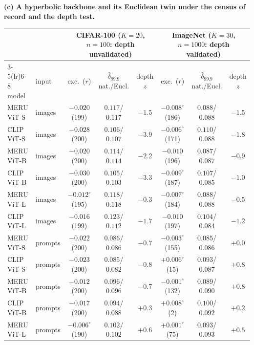 \begin{table}[tbp]\ContinuedFloat
\centering
\scriptsize
\setlength{\tabcolsep}{2.2pt}
\noindent\textbf{(c) A hyperbolic backbone and its Euclidean twin under the census of record and the depth test.}\par\vspace{1.5pt}
\begin{tabular}{llccc@{\hspace{8pt}}ccc}
\toprule
 & & \multicolumn{3}{c}{CIFAR-100 ($K{=}20$, $n{=}100$: depth unvalidated)} & \multicolumn{3}{c}{ImageNet ($K{=}30$, $n{=}1000$: depth validated)} \\
\cmidrule(lr){3-5}\cmidrule(lr){6-8}
model & input & exc.\ ($r$) & $\hat\delta_{99.9}$ nat./Eucl. & depth $z$ & exc.\ ($r$) & $\hat\delta_{99.9}$ nat./Eucl. & depth $z$ \\
\midrule
MERU ViT-S & images & $-0.020$ (199) & $0.117$/$0.117$ & $-1.5$ & $-0.008^{\circ}$ (186) & $0.088$/$0.088$ & $-1.5$ \\
CLIP ViT-S & images & $-0.028$ (200) & $0.106$/$0.107$ & $-3.9$ & $-0.006^{\circ}$ (171) & $0.110$/$0.088$ & $-1.8$ \\
MERU ViT-B & images & $-0.020$ (200) & $0.114$/$0.114$ & $-2.2$ & $-0.010$ (196) & $0.087$/$0.087$ & $-0.9$ \\
CLIP ViT-B & images & $-0.030$ (200) & $0.105$/$0.103$ & $-3.3$ & $-0.009^{\circ}$ (187) & $0.107$/$0.085$ & $-1.0$ \\
MERU ViT-L & images & $-0.012^{\circ}$ (195) & $0.118$/$0.118$ & $-0.3$ & $-0.007^{\circ}$ (184) & $0.088$/$0.088$ & $-0.5$ \\
CLIP ViT-L & images & $-0.016$ (199) & $0.123$/$0.112$ & $-1.7$ & $-0.010$ (197) & $0.104$/$0.084$ & $-1.2$ \\
\midrule
MERU ViT-S & prompts & $-0.022$ (200) & $0.086$/$0.086$ & $-0.7$ & $-0.003^{\circ}$ (155) & $0.085$/$0.086$ & $+0.0$ \\
CLIP ViT-S & prompts & $-0.023$ (200) & $0.085$/$0.082$ & $-0.8$ & $+0.006^{\circ}$ (15) & $0.093$/$0.087$ & $+0.8$ \\
MERU ViT-B & prompts & $-0.012$ (200) & $0.096$/$0.096$ & $-0.7$ & $-0.001^{\circ}$ (132) & $0.089$/$0.090$ & $+0.8$ \\
CLIP ViT-B & prompts & $-0.017$ (200) & $0.094$/$0.088$ & $+0.3$ & $+0.008^{\circ}$ (2) & $0.100$/$0.092$ & $+0.2$ \\
MERU ViT-L & prompts & $-0.006^{\circ}$ (190) & $0.102$/$0.102$ & $+0.6$ & $+0.001^{\circ}$ (75) & $0.093$/$0.093$ & $+0.5$ \\

\end{tabular}
\end{table}
